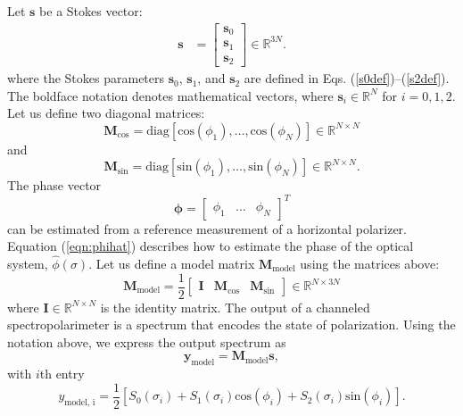 \documentclass[10pt]{article}
\numberwithin{equation}{subsection}
\newcommand{\lbf}[1]{\ensuremath{{\boldsymbol #1}}}
\begin{document}
Let $\lbf s$ be a Stokes vector:
    \begin{align}
        \lbf s &= \begin{bmatrix}
              \lbf s_{0} \\
               \lbf s_{1} \\
               \lbf s_{2}
        \end{bmatrix} \in \mathbb R^{3 N}.
        \label{StokesVector}
    \end{align}
where the Stokes parameters $\lbf s_{0}$, $\lbf s_{1}$, and $\lbf s_{2}$ are defined in Eqs. (\ref{s0def})--(\ref{s2def}).
The boldface notation denotes mathematical vectors, where $\lbf s_i \in \mathbb R^N$ for $i = 0, 1, 2$.
Let us define two diagonal matrices:
    \begin{equation}
        \lbf M_\text{cos} = \text{diag}[\text{cos}(\phi_1), \ldots, \text{cos}(\phi_N)] \in \mathbb R^{N \times N}
    \end{equation}
and
    \begin{equation}
        \lbf M_\text{sin} = \text{diag}[\text{sin}(\phi_1), \ldots, \text{sin}(\phi_N)] \in \mathbb R^{N \times N}.
    \end{equation}
    The phase vector
\begin{equation}
\lbf \phi = \left[
\begin{array}{ccc}
\phi_1
 & \dots
& \phi_N
\end{array}
\right]^T
\label{eqn:PhaseVector}
\end{equation}
       can be estimated from a reference measurement of a horizontal polarizer.
       Equation (\ref{eqn:phihat}) describes how to estimate the phase of the optical system, $\widehat{\phi}(\sigma)$.
       Let us define a model matrix $\lbf M_{\text{model}}$ using the matrices above:
    \begin{equation}
        \lbf M_{\text{model}} = \frac{1}{2} \left[ \begin{array}{c|c|c}
              \lbf I & \lbf M_\text{cos} & \lbf M_\text{sin}
        \end{array} \right] \in \mathbb R^{N \times 3 N}
        \label{Mcsp}
    \end{equation}
where $ \lbf I \in \mathbb R^{N \times N} $ is the identity matrix.
The output of a channeled spectropolarimeter is a spectrum that encodes the state of polarization.
Using the notation above, we express the output spectrum as
    \begin{equation}
        \lbf y_\text{model} = \lbf M_\text{model} \lbf s,
    \end{equation}
with $i$th entry
    \begin{equation}
        y_{\text{model, i}} = \frac{1}{2} \left[S_0(\sigma_i) + S_1(\sigma_i) \text{cos}(\phi_i) + S_2(\sigma_i) \text{sin}(\phi_i) \right].
        \label{eqn:ymodeli}
    \end{equation}
\end{document}

